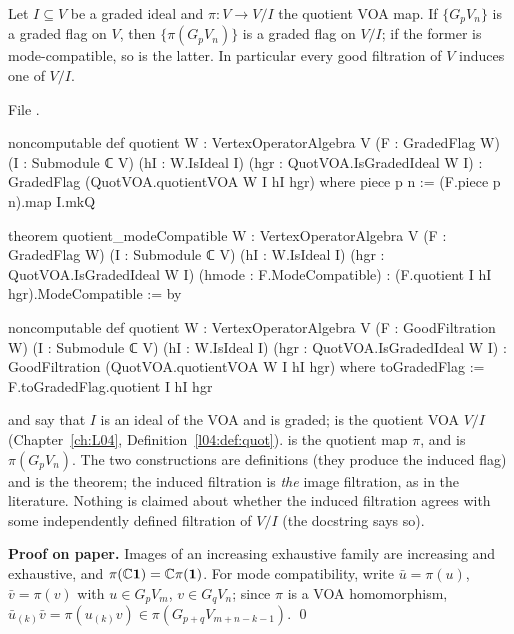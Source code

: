 \begin{theorem}\label{l11:thm:flagquot}
Let $I\subseteq V$ be a graded ideal and $\pi:V\to V/I$ the quotient VOA map. If $\{G_pV_n\}$ is a graded
flag on $V$, then $\{\pi(G_pV_n)\}$ is a graded flag on $V/I$; if the former is mode-compatible, so is
the latter. In particular every good filtration of $V$ induces one of $V/I$.
\end{theorem}
\noindent File .
\begin{leancode}
noncomputable def quotient {W : VertexOperatorAlgebra V} (F : GradedFlag W)
    (I : Submodule ℂ V) (hI : W.IsIdeal I) (hgr : QuotVOA.IsGradedIdeal W I) :
    GradedFlag (QuotVOA.quotientVOA W I hI hgr) where
  piece p n := (F.piece p n).map I.mkQ

theorem quotient_modeCompatible {W : VertexOperatorAlgebra V} (F : GradedFlag W)
    (I : Submodule ℂ V) (hI : W.IsIdeal I) (hgr : QuotVOA.IsGradedIdeal W I)
    (hmode : F.ModeCompatible) : (F.quotient I hI hgr).ModeCompatible := by

noncomputable def quotient {W : VertexOperatorAlgebra V} (F : GoodFiltration W)
    (I : Submodule ℂ V) (hI : W.IsIdeal I) (hgr : QuotVOA.IsGradedIdeal W I) :
    GoodFiltration (QuotVOA.quotientVOA W I hI hgr) where
  toGradedFlag := F.toGradedFlag.quotient I hI hgr
\end{leancode}

\begin{dictionary}
 and \allowbreak{} say that $I$ is an ideal of the VOA and is
graded; \allowbreak{} is the quotient VOA $V/I$ (Chapter~\ref{ch:L04},
Definition~\ref{l04:def:quot}).  is the quotient map $\pi$, and \allowbreak{}\allowbreak{}\allowbreak{} is $\pi(G_pV_n)$. The two  constructions are definitions (they produce the
induced flag) and \allowbreak{} is the theorem; the induced filtration is \emph{the}
image filtration, as in the literature. Nothing is claimed about whether the induced filtration agrees
with some independently defined filtration of $V/I$ (the docstring says so).
\end{dictionary}

\textbf{Proof on paper.} Images of an increasing exhaustive family are increasing and exhaustive, and
$\pi({\mathbb{C}}\mathbf{1}) = {\mathbb{C}}\pi(\mathbf{1})$. For mode compatibility, write $\bar u = \pi(u)$,
$\bar v=\pi(v)$ with $u\in G_pV_m$, $v\in G_qV_n$; since $\pi$ is a VOA homomorphism,
$\bar u_{(k)}\bar v = \pi(u_{(k)}v)\in\pi(G_{p+q}V_{m+n-k-1})$. \qed

